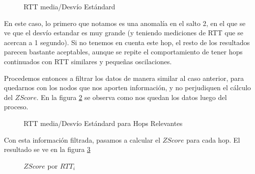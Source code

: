 \begin{figure}
    \centering
    \caption{RTT media/Desv\'io Est\'andard}
    \label{fig:rtt_dev_helsinki}
\end{figure}

\par En este caso, lo primero que notamos es una anomalía en el salto 2, en el que se ve que el desv\'io estandar es muy grande (y teniendo mediciones de RTT que se acercan a 1 segundo). Si no tenemos en cuenta este hop, el resto de los resultados parecen bastante aceptables, aunque se repite el comportamiento de tener hops continuados con RTT similares y peque\~nas oscilaciones.

\par Procedemos entonces a filtrar los datos de manera similar al caso anterior, para quedarnos con los nodos que nos aporten información, y no perjudiquen el cálculo del $ZScore$. En la figura \ref{fig:rtt_dev_helsinki_filtered} se observa como nos quedan los datos luego del proceso.

\begin{figure}
    \centering
    \caption{RTT media/Desv\'io Est\'andard para Hops Relevantes}
    \label{fig:rtt_dev_helsinki_filtered}
\end{figure}

\par Con esta informaci\'on filtrada, pasamos a calcular el $ZScore$ para cada hop. El resultado se ve en la figura \ref{fig:zscore_helsinki_filtered}

\begin{figure}
    \centering
    \caption{$ZScore$ por $RTT_i$}
    \label{fig:zscore_helsinki_filtered}
\end{figure}
